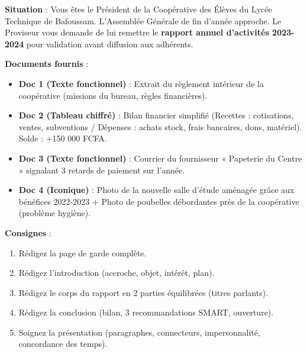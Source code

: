 \documentclass[11pt]{article}
\begin{document}
\begin{exemplebox}
\textbf{Situation} : Vous êtes le Président de la Coopérative des Élèves du Lycée Technique de Bafoussam. L'Assemblée Générale de fin d'année approche. Le Proviseur vous demande de lui remettre le \textbf{rapport annuel d'activités 2023-2024} pour validation avant diffusion aux adhérents.

\textbf{Documents fournis} :
\begin{itemize}
    \item \textbf{Doc 1 (Texte fonctionnel)} : Extrait du règlement intérieur de la coopérative (missions du bureau, règles financières).
    \item \textbf{Doc 2 (Tableau chiffré)} : Bilan financier simplifié (Recettes : cotisations, ventes, subventions / Dépenses : achats stock, frais bancaires, dons, matériel). Solde : +150 000 FCFA.
    \item \textbf{Doc 3 (Texte fonctionnel)} : Courrier du fournisseur « Papeterie du Centre » signalant 3 retards de paiement sur l'année.
    \item \textbf{Doc 4 (Iconique)} : Photo de la nouvelle salle d'étude aménagée grâce aux bénéfices 2022-2023 + Photo de poubelles débordantes près de la coopérative (problème hygiène).
\end{itemize}

\textbf{Consignes} :
\begin{enumerate}
    \item Rédigez la page de garde complète.
    \item Rédigez l'introduction (accroche, objet, intérêt, plan).
    \item Rédigez le corps du rapport en 2 parties équilibrées (titres parlants).
    \item Rédigez la conclusion (bilan, 3 recommandations SMART, ouverture).
    \item Soignez la présentation (paragraphes, connecteurs, impersonnalité, concordance des temps).
\end{enumerate}
\end{exemplebox}
\end{document}

